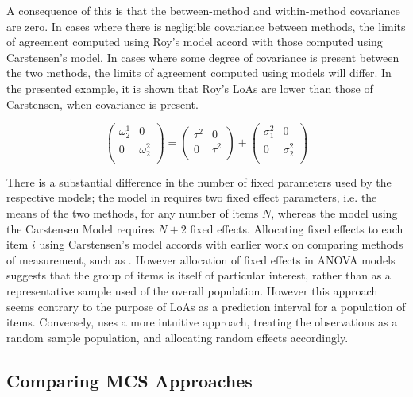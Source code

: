 \documentclass[12pt, a4paper]{report}
\theoremstyle{plain}
\theoremstyle{definition}
\theoremstyle{remark}
\begin{document}
	
	
	A consequence of this is that the between-method and within-method covariance are zero. In cases where there is negligible covariance between methods, the limits of agreement computed using Roy's model accord with those computed using Carstensen's model. In cases where some degree of covariance is present between the two methods, the limits of agreement computed using models will differ. In the presented example, it is shown that Roy's LoAs are lower than those of Carstensen, when covariance is present. 
	
	\[\left(\begin{array}{cc}
	\omega^1_2  & 0 \\
	0 & \omega^2_2 \\
	\end{array}  \right)
	=  \left(
	\begin{array}{cc}
	\tau^2  & 0 \\
	0 & \tau^2 \\
	\end{array} \right)+
	\left(
	\begin{array}{cc}
	\sigma^2_1  & 0 \\
	0 & \sigma^2_2 \\
	\end{array}\right)
	\]
	
There is a substantial difference in the number of fixed parameters used by the respective models; the model in \citet{ARoy2009} requires two fixed effect parameters, i.e. the means of the two methods, for any number of items $N$, whereas the model using the Carstensen Model requires $N+2$ fixed effects. Allocating fixed effects to each item $i$ using Carstensen's model accords with earlier work on comparing methods of measurement, such as \citet{Grubbs48}. However allocation of fixed effects in ANOVA models suggests that the group of items is itself of particular interest, rather than as a representative sample used of the overall population. However this approach seems contrary to the purpose of LoAs as a prediction interval for a population of items. Conversely, \citet{ARoy2009}
	uses a more intuitive approach, treating the observations as a random sample population, and allocating random effects accordingly.
	
	\subsection{Comparing MCS Approaches}	
%	
%	
	
\end{document}
